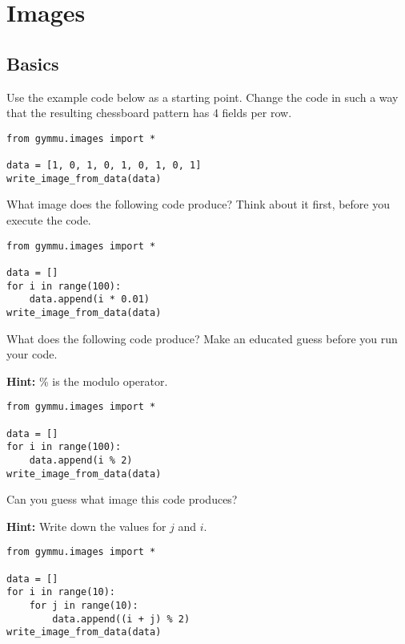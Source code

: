 \documentclass[11pt,a4paper]{report}
\begin{document}
\section{Images}

\subsection{Basics}

\begin{ex}
Use the example code below as a starting point. Change the code in such a way
that the resulting chessboard pattern has 4 fields per row.

\begin{lstlisting}
from gymmu.images import *

data = [1, 0, 1, 0, 1, 0, 1, 0, 1]
write_image_from_data(data)
\end{lstlisting}
\end{ex}

\begin{ex}
What image does the following code produce? Think about it first, before you
execute the code.

\begin{lstlisting}
from gymmu.images import *

data = []
for i in range(100):
    data.append(i * 0.01)
write_image_from_data(data)
\end{lstlisting}
\end{ex}

\begin{ex}
What does the following code produce? Make an educated guess before you run
your code.

\textbf{Hint:} \% is the modulo operator.


\begin{lstlisting}
from gymmu.images import *

data = []
for i in range(100):
    data.append(i % 2)
write_image_from_data(data)
\end{lstlisting}
\end{ex}


\newpage
\begin{ex}
Can you guess what image this code produces?

\textbf{Hint:} Write down the values for $j$ and $i$.

\begin{lstlisting}
from gymmu.images import *

data = []
for i in range(10):
    for j in range(10):
        data.append((i + j) % 2)
write_image_from_data(data)
\end{lstlisting}
\end{ex}
\end{document}

